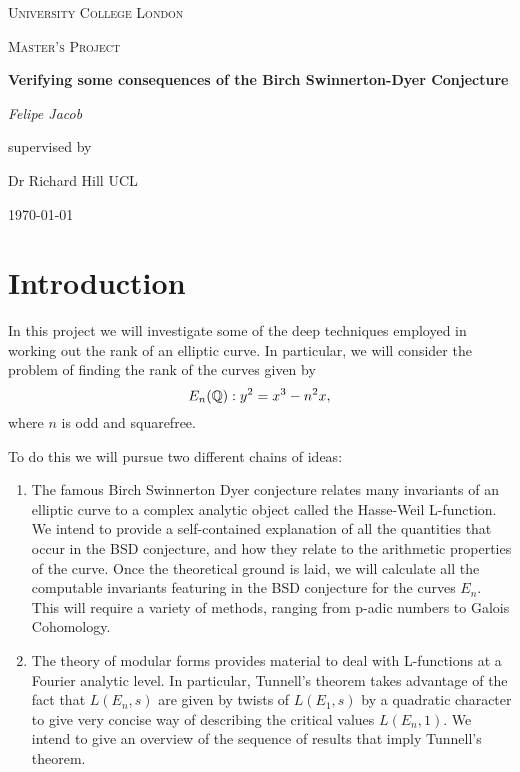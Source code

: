 \documentclass[12pt, a4paper]{report}
\begin{document}
\begin{titlepage}
	\centering
	{\scshape\LARGE University College London \par}
	\vspace{1cm}
	{\scshape\Large Master's Project \par}
	\vspace{1.5cm}
	{\huge\bfseries Verifying some consequences of the Birch Swinnerton-Dyer
    Conjecture \par}
	\vspace{2cm}
	{\Large\itshape Felipe Jacob\par}
	\vfill
	supervised by\par
	Dr Richard Hill \textsc{UCL}

	\vfill

	{\large \today\par}
\end{titlepage}

\tableofcontents
\pagebreak


\chapter{Introduction}

In this project we will investigate some of the deep techniques employed in
working out the rank of an elliptic curve. In particular, we will consider the
problem of finding the rank of the curves given by
\[E_n({\mathbb Q}) : y^2 = x^3 - n^2 x,\]
where $n$ is odd and squarefree.

To do this we will pursue two different chains of ideas:
\begin{enumerate}
\item The famous Birch Swinnerton Dyer conjecture relates many invariants of an
  elliptic curve to a complex analytic object called the Hasse-Weil L-function.
  We intend to provide a self-contained explanation of all the quantities that occur
  in the BSD conjecture, and how they relate to the arithmetic properties of the
  curve. Once the theoretical ground is laid, we will calculate all the
  computable invariants featuring in the BSD conjecture for the curves $E_n$.
  This will require a variety of methods, ranging from p-adic numbers to
  Galois Cohomology.
\item The theory of modular forms provides material to deal with L-functions at
  a Fourier analytic level. In particular, Tunnell's theorem takes advantage of
  the fact that $L(E_n,s)$ are given by twists of $L(E_1,s)$ by a quadratic
  character to give
  very concise way of describing the
  critical values $L(E_n,1).$
  We intend to give an overview of the sequence of results that imply Tunnell's theorem.
\end{enumerate}
\end{document}
